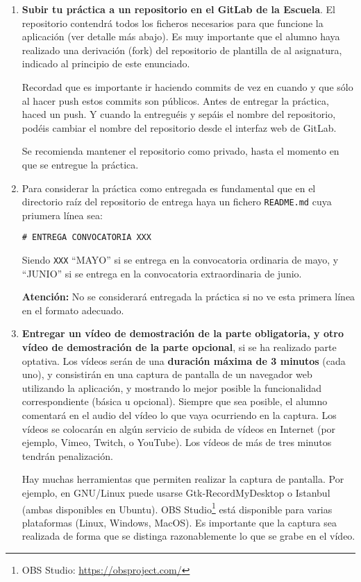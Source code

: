 \begin{enumerate}
  
  \item {\bf Subir tu práctica a un repositorio en el GitLab de la Escuela}. El repositorio contendrá todos los ficheros necesarios para que funcione la aplicación (ver detalle más abajo). Es muy importante que el alumno haya realizado una derivación (fork) del repositorio de plantilla de al asignatura, indicado al principio de este enunciado.

Recordad que es importante ir haciendo commits de vez en cuando y que sólo al hacer push estos commits son públicos. Antes de entregar la práctica, haced un push. Y cuando la entreguéis y sepáis el nombre del repositorio, podéis cambiar el nombre del repositorio desde el interfaz web de GitLab. 

Se recomienda mantener el repositorio como privado, hasta el momento en que se entregue la práctica.

\item Para considerar la práctica como entregada es fundamental que en el directorio raíz del repositorio de entrega haya un fichero \texttt{README.md} cuya priumera línea sea:

\begin{verbatim}
# ENTREGA CONVOCATORIA XXX
\end{verbatim}

Siendo \texttt{XXX} ``MAYO'' si se entrega en la convocatoria ordinaria de mayo, y ``JUNIO'' si se entrega en la convocatoria extraordinaria de junio.

\textbf{Atención:} No se considerará entregada la práctica si no ve esta primera línea en el formato adecuado.

 \item {\bf Entregar un vídeo de demostración de la parte obligatoria, y otro vídeo de demostración de la parte opcional}, si se ha realizado parte optativa. Los vídeos serán de una {\bf duración máxima de 3 minutos} (cada uno), y consistirán en una captura de pantalla de un navegador web utilizando la aplicación, y mostrando lo mejor posible la funcionalidad correspondiente (básica u opcional). Siempre que sea posible, el alumno comentará en el audio del vídeo lo que vaya ocurriendo en la captura. Los vídeos se colocarán en algún servicio de subida de vídeos en Internet (por ejemplo, Vimeo, Twitch, o YouTube). Los vídeos de más de tres minutos tendrán penalización.

Hay muchas herramientas que permiten realizar la captura de pantalla. Por ejemplo, en GNU/Linux puede usarse Gtk-RecordMyDesktop o Istanbul (ambas disponibles en Ubuntu). OBS Studio\footnote{OBS Studio: \url{https://obsproject.com/}} está disponible para varias plataformas (Linux, Windows, MacOS). Es importante que la captura sea realizada de forma que se distinga razonablemente lo que se grabe en el vídeo.


\end{enumerate}
